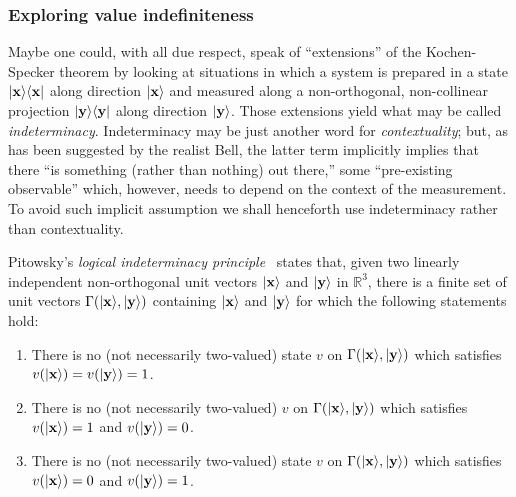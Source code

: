 \subsubsection*{Exploring value indefiniteness}
\label{2017-b-c-eokst}

Maybe one could, with all due respect,
speak of ``extensions'' of the Kochen-Specker theorem by looking at situations
in which a system is prepared in a state
$\vert {\bf x} \rangle \langle {\bf x} \vert$  along direction
$\vert {\bf x} \rangle$
and measured along a non-orthogonal, non-collinear projection
$\vert {\bf y} \rangle \langle {\bf y} \vert$  along direction
$\vert {\bf y} \rangle$.
Those extensions yield what may be called~\cite{pitowsky:218,hru-pit-2003} {\em indeterminacy}.
Indeterminacy may be just another word for {\em contextuality};
but, as has been suggested by the realist Bell,
the latter term implicitly implies that
there ``is something (rather than nothing) out there,'' some ``pre-existing observable''
which, however, needs to depend on the context of the measurement.
To avoid such implicit assumption we shall henceforth use  indeterminacy rather than contextuality.

Pitowsky's  {\em logical indeterminacy principle}~\cite[Theorem~6, p.~226]{pitowsky:218}
states that, given two linearly independent
non-orthogonal unit vectors
$\vert {\bf x} \rangle$
and
$\vert {\bf y} \rangle$
in $\mathbb{R}^3$,
there is a finite set of unit vectors
$\Gamma ( \vert {\bf x} \rangle , \vert {\bf y} \rangle )$ containing
$\vert {\bf x} \rangle$
and
$\vert {\bf y} \rangle$
for which the following statements hold:
\begin{enumerate}
\item
There is no (not necessarily two-valued) state $v$ on $\Gamma ( \vert {\bf x} \rangle , \vert {\bf y} \rangle )$ which
satisfies
$v ( \vert {\bf x} \rangle ) = v ( \vert {\bf y} \rangle ) =1$.
\item
There is no (not necessarily two-valued)  $v$ on $\Gamma ( \vert {\bf x} \rangle , \vert {\bf y} \rangle )$
which satisfies $v ( \vert {\bf x} \rangle ) = 1$ and $ v ( \vert {\bf y} \rangle ) =0$.
\item
There is no (not necessarily two-valued)  state $v$ on $\Gamma ( \vert {\bf x} \rangle , \vert {\bf y} \rangle )$
which satisfies $v ( \vert {\bf x} \rangle ) = 0$ and $ v ( \vert {\bf y} \rangle ) =1$.
\end{enumerate}

